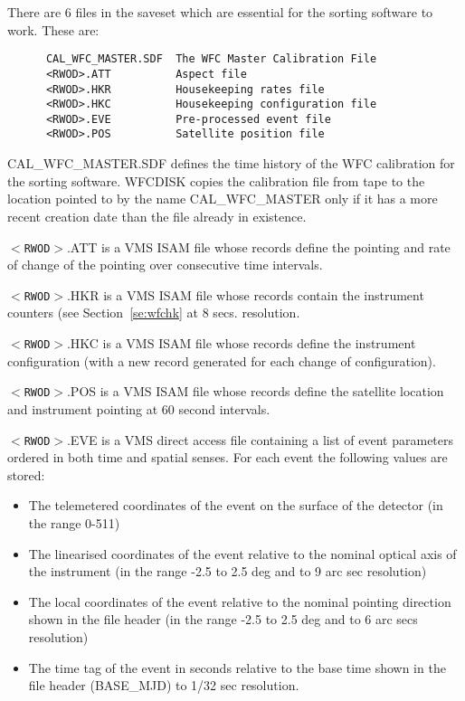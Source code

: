 There are 6 files in the saveset which are essential for the sorting software
to work. These are:

\begin{verbatim}
      CAL_WFC_MASTER.SDF  The WFC Master Calibration File
      <RWOD>.ATT          Aspect file
      <RWOD>.HKR          Housekeeping rates file
      <RWOD>.HKC          Housekeeping configuration file
      <RWOD>.EVE          Pre-processed event file 
      <RWOD>.POS          Satellite position file
\end{verbatim}

CAL\_WFC\_MASTER.SDF defines the time history of the 
WFC calibration for the sorting software. WFCDISK copies the calibration
file from tape to the location pointed to by the name CAL\_WFC\_MASTER 
only if it has a more recent creation date than the file already in existence.

$<${\tt RWOD}$>$.ATT is a VMS ISAM file whose records define the pointing
and rate of change of the pointing over consecutive time intervals.

$<${\tt RWOD}$>$.HKR is a VMS ISAM file whose records contain the instrument
counters (see Section~\ref{se:wfchk} at 8 secs. resolution.

$<${\tt RWOD}$>$.HKC is a VMS ISAM file whose records define the instrument
configuration (with a new record generated for each change of configuration).

$<${\tt RWOD}$>$.POS is a VMS ISAM file whose records define the 
satellite location and instrument pointing at 60 second intervals.

$<${\tt RWOD}$>$.EVE is a VMS direct access file containing a list of event
parameters ordered in both time and spatial senses. For each event the
following values are stored:

\begin{itemize}
\item
The telemetered coordinates of the event on the surface of the
detector (in the range 0-511)
\item
The linearised coordinates of the event relative to the
nominal optical axis of the instrument (in the range -2.5 to 2.5 deg and
to 9 arc sec resolution)
\item
The local coordinates of the event relative to the nominal
pointing direction shown in the file header (in the range -2.5 to 2.5 deg and
to 6 arc secs resolution)
\item
The time tag of the event in seconds relative to the base time shown
in the file header (BASE\_MJD) to 1/32 sec resolution.
\end{itemize}

